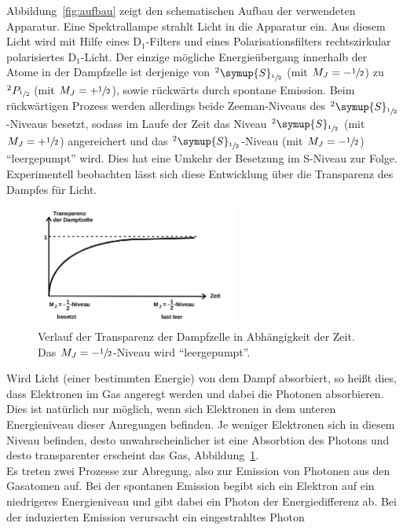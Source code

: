 \documentclass[
  bibliography=totoc,     %
  captions=tableheading,  %
  titlepage=firstiscover, %
]{scrartcl}
\begin{document}
\noindent
Abbildung~\ref{fig:aufbau} zeigt den schematischen Aufbau der verwendeten
Apparatur. Eine Spektrallampe strahlt Licht in die Apparatur ein. Aus diesem
Licht wird mit Hilfe eines $\text{D}_1$-Filters und eines Polarisationsfilters
rechtszirkular polarisiertes $\text{D}_1$-Licht. Der einzige mögliche
Energieübergang innerhalb der Atome in der Dampfzelle ist derjenige von
$^2\symup{S}_{\sfrac{1}{2}}$ (mit $M_J=-\sfrac{1}{2}$) zu
$^2P_{\sfrac{1}{2}}$ (mit $M_J=+\sfrac{1}{2}$), sowie rückwärts durch
spontane Emission. Beim rückwärtigen Prozess werden allerdings beide
Zeeman-Niveaus des $^2\symup{S}_{\sfrac{1}{2}}$-Niveaus besetzt, sodass im
Laufe der Zeit das Niveau $^2\symup{S}_{\sfrac{1}{2}}$ (mit
$M_J=+\sfrac{1}{2}$) angereichert und das
$^2\symup{S}_{\sfrac{1}{2}}$-Niveau (mit $M_J=-\sfrac{1}{2}$)
\enquote{leergepumpt} wird. Dies hat eine Umkehr der Besetzung im S-Niveau zur
Folge. Experimentell beobachten lässt sich diese Entwicklung über die
Transparenz des Dampfes für Licht.
%
\begin{figure}[htb]
  \centering
  \includegraphics[width=0.6\textwidth]{transparenz.pdf}
  \caption{Verlauf der Transparenz der Dampfzelle in Abhängigkeit der Zeit. Das $M_J=-\sfrac{1}{2}$-Niveau wird \enquote{leergepumpt}\cite{anleitung}.}
  \label{fig:transparenz}
\end{figure}
\noindent
Wird Licht (einer bestimmten Energie) von dem Dampf absorbiert, so heißt dies,
dass Elektronen im Gas angeregt werden und dabei die Photonen absorbieren. Dies
ist natürlich nur möglich, wenn sich Elektronen in dem unteren Energieniveau
dieser Anregungen befinden. Je weniger Elektronen sich in diesem Niveau
befinden, desto unwahrscheinlicher ist eine Absorbtion des Photons und desto
transparenter erscheint das Gas, Abbildung~\ref{fig:transparenz}. \\
Es treten zwei Prozesse zur Abregung, also zur Emission von Photonen aus den
Gasatomen auf. Bei der spontanen Emission begibt sich ein Elektron auf
ein niedrigeres Energieniveau und gibt dabei ein Photon der Energiedifferenz
ab. Bei der induzierten Emission verursacht ein eingestrahltes Photon
\end{document}
